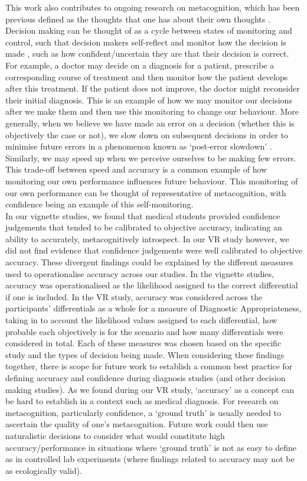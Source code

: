 \documentclass[a4paper, nobind]{templates/ociamthesis}
\begin{document}
This work also contributes to ongoing research on metacognition, which has been previous defined as the thoughts that one has about their own thoughts \autocite{flavell_metacognition_1979}. Decision making can be thought of as a cycle between states of monitoring and control, such that decision makers self-reflect and monitor how the decision is made \autocite{nelson1990}, such as how confident/uncertain they are that their decision is correct. For example, a doctor may decide on a diagnosis for a patient, prescribe a corresponding course of treatment and then monitor how the patient develops after this treatment. If the patient does not improve, the doctor might reconsider their initial diagnosis. This is an example of how we may monitor our decisions after we make them and then use this monitoring to change our behaviour. More generally, when we believe we have made an error on a decision (whether this is objectively the case or not), we slow down on subsequent decisions in order to minimise future errors in a phenomenon known as `post-error slowdown' \autocite{rabbitt_three_1968}. Similarly, we may speed up when we perceive ourselves to be making few errors. This trade-off between speed and accuracy is a common example of how monitoring our own performance influences future behaviour. This monitoring of our own performance can be thought of representative of metacognition, with confidence being an example of this self-monitoring.\\

In our vignette studies, we found that medical students provided confidence judgements that tended to be calibrated to objective accuracy, indicating an ability to accurately, metacognitively introspect. In our VR study however, we did not find evidence that confidence judgements were well calibrated to objective accuracy. These divergent findings could be explained by the different measures used to operationalise accuracy across our studies. In the vignette studies, accuracy was operationalised as the likelihood assigned to the correct differential if one is included. In the VR study, accuracy was considered across the participants' differentials as a whole for a measure of Diagnostic Appropriateness, taking in to account the likelihood values assigned to each differential, how probable each objectively is for the scenario and how many differentials were considered in total. Each of these measures was chosen based on the specific study and the types of decision being made. When considering these findings together, there is scope for future work to establish a common best practice for defining accuracy and confidence during diagnosis studies (and other decision making studies). As we found during our VR study, `accuracy' as a concept can be hard to establish in a context such as medical diagnosis. For research on metacognition, particularly confidence, a `ground truth' is usually needed to ascertain the quality of one's metacognition. Future work could then use naturalistic decisions to consider what would constitute high accuracy/performance in situations where `ground truth' is not as easy to define as in controlled lab experiments (where findings related to accuracy may not be as ecologically valid).\\
\end{document}
